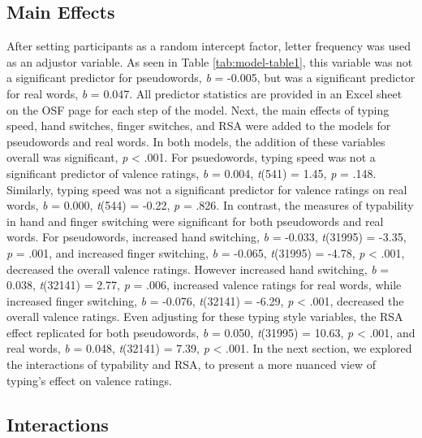 \documentclass[english,man]{apa6}
\theoremstyle{definition}
\theoremstyle{definition}
\theoremstyle{definition}
\theoremstyle{remark}
\begin{document}
\subsection{Main Effects}\label{main-effects}

After setting participants as a random intercept factor, letter
frequency was used as an adjustor variable. As seen in Table
\ref{tab:model-table1}, this variable was not a significant predictor
for pseudowords, \emph{b} = -0.005, but was a significant predictor for
real words, \emph{b} = 0.047. All predictor statistics are provided in
an Excel sheet on the OSF page for each step of the model. Next, the
main effects of typing speed, hand switches, finger switches, and RSA
were added to the models for pseudowords and real words. In both models,
the addition of these variables overall was significant, \emph{p}
\textless{} .001. For psuedowords, typing speed was not a significant
predictor of valence ratings, \emph{b} = 0.004, \emph{t}(541) = 1.45,
\emph{p} = .148. Similarly, typing speed was not a significant predictor
for valence ratings on real words, \emph{b} = 0.000, \emph{t}(544) =
-0.22, \emph{p} = .826. In contrast, the measures of typability in hand
and finger switching were significant for both pseudowords and real
words. For pseudowords, increased hand switching, \emph{b} = -0.033,
\emph{t}(31995) = -3.35, \emph{p} = .001, and increased finger
switching, \emph{b} = -0.065, \emph{t}(31995) = -4.78, \emph{p}
\textless{} .001, decreased the overall valence ratings. However
increased hand switching, \emph{b} = 0.038, \emph{t}(32141) = 2.77,
\emph{p} = .006, increased valence ratings for real words, while
increased finger switching, \emph{b} = -0.076, \emph{t}(32141) = -6.29,
\emph{p} \textless{} .001, decreased the overall valence ratings. Even
adjusting for these typing style variables, the RSA effect replicated
for both pseudowords, \emph{b} = 0.050, \emph{t}(31995) = 10.63,
\emph{p} \textless{} .001, and real words, \emph{b} = 0.048,
\emph{t}(32141) = 7.39, \emph{p} \textless{} .001. In the next section,
we explored the interactions of typability and RSA, to present a more
nuanced view of typing's effect on valence ratings.

\subsection{Interactions}\label{interactions}
\end{document}
